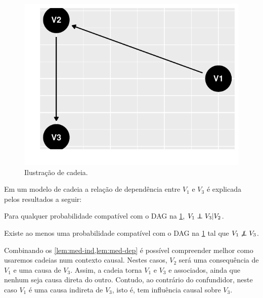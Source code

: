 \begin{knitrout}
\color{fgcolor}\begin{figure}[t]

{\centering \includegraphics[width=\maxwidth]{./figures/cadeia-1} 

}

\caption[Ilustração de cadeia]{Ilustração de cadeia.}\label{fig:cadeia}
\end{figure}

\end{knitrout}

Em um modelo de cadeia 
a relação de dependência entre 
$V_1$ e $V_3$ é explicada pelos
resultados a seguir:

\begin{lemma}
 \label{lem:med-ind}
 Para qualquer probabilidade compatível com 
 o DAG na \cref{fig:cadeia},
 $V_1 \perp\!\!\!\!\perp V_3 | V_2$.
\end{lemma}

\begin{lemma}
 \label{lem:med-dep}
 Existe ao menos uma probabilidade compatível com
 o DAG na \cref{fig:cadeia} tal que
 $V_1 \not\perp\!\!\!\!\perp V_3$.
\end{lemma}

Combinando os \cref{lem:med-ind,lem:med-dep} é 
possível compreender melhor como 
usaremos cadeias num contexto causal.
Nestes casos, $V_2$ será uma consequência de $V_1$ e
uma causa de $V_3$. Assim, a cadeia torna
$V_1$ e $V_3$ e associados, 
ainda que nenhum seja causa direta do outro.
Contudo, ao contrário do confundidor,
neste caso $V_1$ é uma causa indireta de $V_3$,
isto é, tem influência causal sobre $V_3$.

